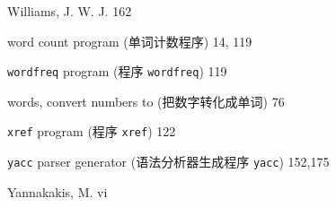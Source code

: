 \begin{multicols}{2}
\hangindent=2pc  Williams, J. W. J. 162

\hangindent=2pc  word count program (单词计数程序) 14, 119

\hangindent=2pc  \verb'wordfreq' program (程序 \verb'wordfreq') 119

\hangindent=2pc  words, convert numbers to (把数字转化成单词) 76

\hangindent=2pc  \verb'xref' program (程序 \verb'xref') 122

\hangindent=2pc  \verb'yacc' parser generator
(语法分析器生成程序 \verb'yacc') 152,175

\hangindent=2pc  Yannakakis, M. vi

\end{multicols}
